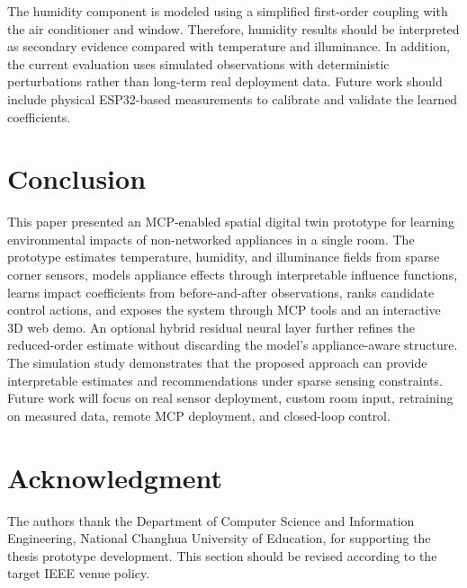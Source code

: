 \documentclass[conference]{IEEEtran}
\begin{document}
The humidity component is modeled using a simplified first-order coupling with the air conditioner and window. Therefore, humidity results should be interpreted as secondary evidence compared with temperature and illuminance. In addition, the current evaluation uses simulated observations with deterministic perturbations rather than long-term real deployment data. Future work should include physical ESP32-based measurements to calibrate and validate the learned coefficients.

\section{Conclusion}
This paper presented an MCP-enabled spatial digital twin prototype for learning environmental impacts of non-networked appliances in a single room. The prototype estimates temperature, humidity, and illuminance fields from sparse corner sensors, models appliance effects through interpretable influence functions, learns impact coefficients from before-and-after observations, ranks candidate control actions, and exposes the system through MCP tools and an interactive 3D web demo. An optional hybrid residual neural layer further refines the reduced-order estimate without discarding the model's appliance-aware structure. The simulation study demonstrates that the proposed approach can provide interpretable estimates and recommendations under sparse sensing constraints. Future work will focus on real sensor deployment, custom room input, retraining on measured data, remote MCP deployment, and closed-loop control.

\section*{Acknowledgment}
The authors thank the Department of Computer Science and Information Engineering, National Changhua University of Education, for supporting the thesis prototype development. This section should be revised according to the target IEEE venue policy.



\end{document}
